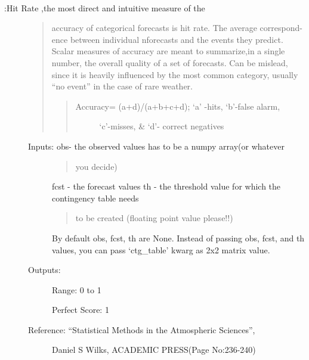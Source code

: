 \documentclass[letterpaper,10pt,english]{sphinxmanual}
\begin{document}
\begin{fulllineitems}
\label{diagnosis:ctgfunction.accuracy}~\begin{description}
\item[{{\hyperref[diagnosis:ctgfunction.accuracy]{}}:Hit Rate ,the most direct and intuitive measure of the}] \leavevmode\begin{quote}

accuracy of categorical forecasts is hit rate. The average correspond-
ence between individual nforecasts and the events they predict. Scalar
measures  of accuracy are meant to summarize,in a single number, the
overall quality of a set of forecasts. Can be mislead, since it is
heavily influenced by the most common category, usually ``no event''
in the case of rare weather.
\begin{quote}
\begin{description}
\item[{Accuracy= (a+d)/(a+b+c+d); `a' -hits, `b'-false alarm,}] \leavevmode
`c'-misses, \& `d'- correct negatives

\end{description}
\end{quote}
\end{quote}
\begin{description}
\item[{Inputs: obs- the observed values has to be a numpy array(or whatever}] \leavevmode\begin{quote}

you decide)
\end{quote}

fcst - the forecast values
th  - the threshold value for which the contingency table needs
\begin{quote}

to be created (floating point value please!!)
\end{quote}

By default obs, fcst, th are None. Instead of passing obs, fcst,
and th values, you can pass `ctg\_table' kwarg as 2x2 matrix value.

\item[{Outputs:}] \leavevmode
Range: 0 to 1

Perfect Score: 1

\item[{Reference: ``Statistical Methods in the Atmospheric Sciences'',}] \leavevmode
Daniel S Wilks, ACADEMIC PRESS(Page No:236-240)


\end{description}
\end{description}
\end{fulllineitems}
\end{document}
